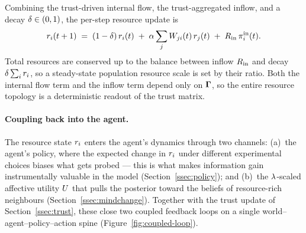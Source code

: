 Combining the trust-driven internal flow, the trust-aggregated inflow,
and a decay $\delta \in (0,1)$, the per-step resource update is
\begin{equation}
r_{i}(t+1)
\;=\;
(1-\delta)\,r_{i}(t)
\;+\;
\alpha \sum_{j} W_{ji}(t)\,r_{j}(t)
\;+\;
R_{\mathrm{in}}\,\pi^{\mathrm{in}}_{i}(t).
\label{eq:resource-update}
\end{equation}
Total resources are conserved up to the balance between inflow
$R_{\mathrm{in}}$ and decay $\delta\sum_i r_{i}$, so a steady-state
population resource scale is set by their ratio. Both the internal
flow term and the inflow term depend only on $\boldsymbol{\Gamma}$, so the
entire resource topology is a deterministic readout of the trust
matrix.

\paragraph{Coupling back into the agent.}
The resource state $r_{i}$ enters the agent's dynamics through
two channels: (a)~the agent's policy, where the expected change in
$r_{i}$ under different experimental choices biases what gets
probed --- this is what makes information gain instrumentally valuable
in the model (Section~\ref{ssec:policy}); and (b)~the $\lambda$-scaled
affective utility $U$ that pulls the posterior toward the
beliefs of resource-rich neighbours
(Section~\ref{ssec:mindchange}). Together with the trust update of
Section~\ref{ssec:trust}, these close two coupled feedback loops on a
single world--agent--policy--action spine
(Figure~\ref{fig:coupled-loop}).

